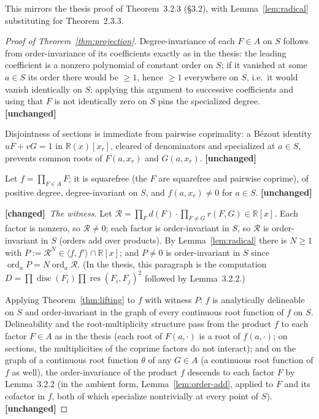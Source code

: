\documentclass[11pt,a4paper]{article}
\theoremstyle{plain}
\theoremstyle{definition}
\newcommand{\R}{\mathbb{R}}
\DeclareMathOperator{\ord}{ord}
\DeclareMathOperator{\res}{res}
\DeclareMathOperator{\disc}{disc}
\newcommand{\ideal}[1]{\langle #1\rangle}
\newcommand{\UNCHANGED}{\textbf{[unchanged]}}
\newcommand{\CHANGED}{\textbf{[changed]}}
\begin{document}
This mirrors the thesis proof of Theorem~3.2.3 (\S3.2), with
Lemma~\ref{lem:radical} substituting for Theorem~2.3.3.

\begin{proof}[Proof of Theorem~\ref{thm:projection}]
Degree-invariance of each $F\in A$ on $S$ follows from order-invariance of its
coefficients exactly as in the thesis: the leading coefficient is a nonzero
polynomial of constant order on $S$; if it vanished at some $a\in S$ its order
there would be $\ge 1$, hence $\ge 1$ everywhere on $S$, i.e.\ it would vanish
identically on $S$; applying this argument to successive coefficients and
using that $F$ is not identically zero on $S$ pins the specialized degree.
\UNCHANGED

Disjointness of sections is immediate from pairwise coprimality: a B\'ezout
identity $uF+vG=1$ in $\R(x)[x_r]$, cleared of denominators and specialized at
$a\in S$, prevents common roots of $F(a,x_r)$ and $G(a,x_r)$. \UNCHANGED

Let $f=\prod_{F\in A}F$; it is squarefree (the $F$ are squarefree and pairwise
coprime), of positive degree, degree-invariant on $S$, and $f(a,x_r)\neq 0$
for $a\in S$. \UNCHANGED

\CHANGED\ \emph{The witness.} Let
$\mathcal R=\prod_F d(F)\cdot\prod_{F\neq G}r(F,G)\in\R[x]$. Each factor is
nonzero, so $\mathcal R\neq 0$; each factor is order-invariant in $S$, so
$\mathcal R$ is order-invariant in $S$ (orders add over products). By
Lemma~\ref{lem:radical} there is $N\ge1$ with
$P:=\mathcal R^{N}\in\ideal{f,f'}\cap\R[x]$; and $P\neq0$ is order-invariant
in $S$ since $\ord_a P=N\ord_a\mathcal R$. (In the thesis, this paragraph is
the computation $D=\prod\disc(F_i)\prod\res(F_i,F_j)^2$ followed by
Lemma~3.2.2.)

Applying Theorem~\ref{thm:lifting} to $f$ with witness $P$: $f$ is
analytically delineable on $S$ and order-invariant in the graph of every
continuous root function of $f$ on $S$. Delineability and the
root-multiplicity structure pass from the product $f$ to each factor $F\in A$
as in the thesis (each root of $F(a,\cdot)$ is a root of $f(a,\cdot)$; on
sections, the multiplicities of the coprime factors do not interact); and on
the graph of a continuous root function $\theta$ of any $G\in A$
(a continuous root function of $f$ as well), the order-invariance of the
product $f$ descends to each factor $F$ by Lemma~3.2.2 (in the ambient form,
Lemma~\ref{lem:order-add}, applied to $F$ and its cofactor in $f$, both of
which specialize nontrivially at every point of $S$). \UNCHANGED
\end{proof}
\end{document}
